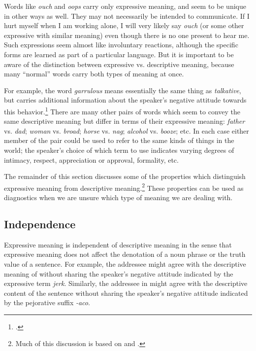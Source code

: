 Words like \textit{ouch} and \textit{oops} carry only expressive meaning, and seem to be unique in other ways as well. They may not necessarily be intended to communicate. If I hurt myself when I am working alone, I will very likely say \textit{ouch} (or some other expressive with similar meaning) even though there is no one present to hear me. Such expressions seem almost like involuntary reactions, although the specific forms are learned as part of a particular language. But it is important to be aware of the distinction between expressive vs. descriptive meaning, because many “normal” words carry both types of meaning at once.



For example, the word \textit{garrulous} means essentially the same thing as \textit{talkative}, but carries additional information about the speaker’s negative attitude towards this behavior.\footnote{\citet{Barker2002}.} There are many other pairs of words which seem to convey the same descriptive meaning but differ in terms of their expressive meaning: \textit{father} vs. \textit{dad}; \textit{woman} vs. \textit{broad}; \textit{horse} vs. \textit{nag}; \textit{alcohol} vs. \textit{booze}; etc. In each case either member of the pair could be used to refer to the same kinds of things in the world; the speaker’s choice of which term to use indicates varying degrees of intimacy, respect, appreciation or approval, formality, etc.


\largerpage
The remainder of this section discusses some of the properties which distinguish expressive meaning from descriptive meaning.\footnote{Much of this discussion is based on \citet{Cruse1986,Cruse2000} and \citet{Potts2007c}.} These properties can be used as diagnostics when we are unsure which type of meaning we are dealing with.


\subsection{Independence}\label{sec:2.6.1}

Expressive meaning is independent of descriptive meaning in the sense that expressive meaning does not affect the denotation of a noun phrase or the truth value of a sentence. For example, the addressee might agree with the descriptive meaning of  without sharing the speaker’s negative attitude indicated by the expressive term \textit{jerk}. Similarly, the addressee in  might agree with the descriptive content of the sentence without sharing the speaker’s negative attitude indicated by the pejorative suffix \textit{-aco}.


